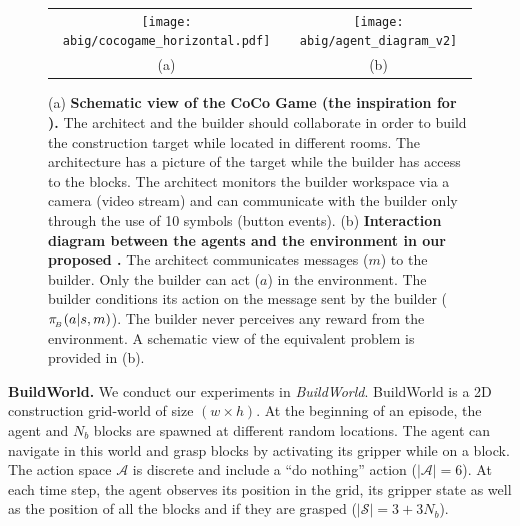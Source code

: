 \begin{figure}[!h]
    \centering
    \begin{tabular}{cc}
    \texttt{[image: abig/cocogame\_horizontal.pdf]} &\texttt{[image: abig/agent\_diagram\_v2]} \\
    \small(a) & \small (b) 
    \end{tabular}
    \caption{(a) \textbf{Schematic view of the CoCo Game (the inspiration for \abp).} The architect and the builder should collaborate in order to build the construction target while located in different rooms. The architecture has a picture of the target while the builder has access to the blocks. The architect monitors the builder workspace via a camera (video stream) and can communicate with the builder only through the use of 10 symbols (button events). (b) \textbf{Interaction diagram between the agents and the environment in our proposed \abp.} The architect communicates messages ($m$) to the builder.  Only the builder can act ($a$) in the environment. The builder conditions its action on the message sent by the builder ($\pi_{\!_B}(a|s,m)$). The builder never perceives any reward from the environment. A schematic view of the equivalent \abp problem is provided in (b).}
    \label{fig:agent-diagram}
\end{figure}


\noindent\textbf{BuildWorld. }
We conduct our experiments in \textit{BuildWorld}. BuildWorld is a 2D construction grid-world of size $(w\times h)$. At the beginning of an episode, the agent and $N_b$ blocks are spawned at different random locations. The agent can navigate in this world and grasp blocks by activating its gripper while on a block. The action space $\mathcal{A}$ is discrete and include a ``do nothing'' action ($|\mathcal{A}|=6$).
At each time step, the agent observes its position in the grid, its gripper state as well as the position of all the blocks and if they are grasped ($|\mathcal{S}|=3+3N_{b}$). 

